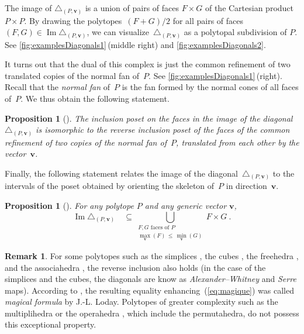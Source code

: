 \documentclass{amsart}
\newcommand{\darkblue}{\color{darkblue}} %
\newtheorem{proposition}[theorem]{Proposition}
\theoremstyle{definition}
\newtheorem{remark}[theorem]{Remark}
\renewcommand{\b}[1]{{\boldsymbol{#1}}} %
\DeclareMathOperator{\Ima}{Im} %
\newcommand{\defn}[1]{\textsl{\darkblue #1}} %
\renewcommand{\b}[1]{\boldsymbol{#1}} %
\begin{document}
The image of $\triangle_{(P,\b{v})}$ is a union of pairs of faces $F \times G$ of the Cartesian product~$P \times P$.
By drawing the polytopes~${(F+G)/2}$ for all pairs of faces $(F,G) \in \Ima \triangle_{(P,\b{v})}$, we can visualize~$\triangle_{(P,\b{v})}$ as a polytopal subdivision of $P$.
See \cref{fig:examplesDiagonals1}\,(middle right) and \cref{fig:examplesDiagonals2}.

It turns out that the dual of this complex is just the common refinement of two translated copies of the normal fan of~$P$.
See \cref{fig:examplesDiagonals1}\,(right).
Recall that the \defn{normal fan} of~$P$ is the fan formed by the normal cones of all faces of~$P$.
We thus obtain the following statement.

\begin{proposition}[{\cite[Coro.~1.4]{LA21}}]
\label{prop:diagonalCommonRefinement}
The inclusion poset on the faces in the image of the diagonal~$\triangle_{(P,\b{v})}$ is isomorphic to the reverse inclusion poset of the faces of the common refinement of two copies of the normal fan of~$P$, translated from each other by the vector~$\b{v}$. 
\end{proposition}

Finally, the following statement relates the image of the diagonal~$\triangle_{(P, \b{v})}$ to the intervals of the poset obtained by orienting the skeleton of~$P$ in direction~$\b{v}$.

\begin{proposition}[{\cite[Prop. 1.17]{LA21}}]
\label{prop:magicalFormula}
For any polytope $P$ and any generic vector $\b{v}$,
\begin{equation}
\label{eq:magique}
\Ima\triangle_{(P, \b{v})} \quad \subseteq \bigcup_{\substack{F,G \text{ faces of } P \\ \max_{\b{v}}(F) \, \le \, \min_{\b{v}}(G)}} F \times G \ .
\end{equation}
\end{proposition}

\begin{remark}
For some polytopes such as the simplices \cite{EilenbergMacLane54}, the cubes \cite{serre1951}, the freehedra \cite{saneblidze2009}, and the associahedra \cite{masudaDiagonalAssociahedra2021}, the reverse inclusion also holds (in the case of the simplices and the cubes, the diagonals are know as \emph{Alexander--Whitney} and \emph{Serre} maps).
According to \cite{masudaDiagonalAssociahedra2021}, the resulting equality enhancing~(\ref{eq:magique}) was called \defn{magical formula} by J.-L. Loday.
Polytopes of greater complexity such as the multiplihedra \cite{MazuirLA22} or the operahedra \cite{LA21}, which include the permutahedra, do not possess this exceptional property. 
\end{remark}
\end{document}
